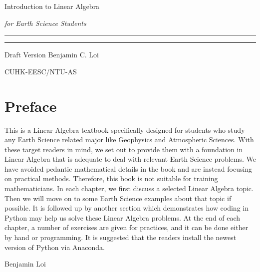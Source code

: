 \begin{titlepage}
    {\Huge\raggedright Introduction to Linear Algebra \par}
    {\Large\raggedright \textit{for Earth Science Students} \hfill\textcolor{Mahogany}{\rule{3mm}{3mm}} \par}
    \vspace{3mm}\hrule\par
    {\Large\raggedleft Draft Version \hfill Benjamin C. Loi \par}
    \vfill
    {\Large\raggedleft CUHK-EESC/NTU-AS \par}
\end{titlepage}

\chapter*{Preface}
This is a Linear Algebra textbook specifically designed for students who study any Earth Science related major like Geophysics and Atmospheric Sciences. With these target readers in mind, we set out to provide them with a foundation in Linear Algebra that is adequate to deal with relevant Earth Science problems. We have avoided pedantic mathematical details in the book and are instead focusing on practical methods. Therefore, this book is not suitable for training mathematicians. In each chapter, we first discuss a selected Linear Algebra topic. Then we will move on to some Earth Science examples about that topic if possible. It is followed up by another section which demonstrates how coding in Python may help us solve these Linear Algebra problems. At the end of each chapter, a number of exercises are given for practices, and it can be done either by hand or programming. It is suggested that the readers install the newest version of Python via Anaconda. \par
{\raggedleft Benjamin Loi \par}

\tableofcontents